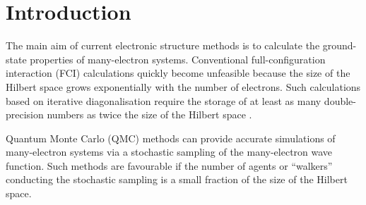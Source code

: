 \chapter{Introduction}
\ifpdf
    \graphicspath{{Introduction/IntroductionFigs/PNG/}{Introduction/IntroductionFigs/PDF/}{Introduction/IntroductionFigs/}}
\else
    \graphicspath{{Introduction/IntroductionFigs/EPS/}{Introduction/IntroductionFigs/}}
\fi



The main aim of current electronic structure methods is to calculate the ground-state properties of many-electron systems. Conventional full-configuration interaction (FCI) calculations quickly become unfeasible because the size of the Hilbert space grows exponentially with the number of electrons. Such calculations based on iterative diagonalisation require the storage of at least as many double-precision numbers as twice the size of the Hilbert space \cite{Szabados2011}. 

Quantum Monte Carlo (QMC) methods can provide accurate simulations of many-electron systems via a stochastic sampling of the many-electron wave function. Such methods are favourable if the number of agents or ``walkers'' conducting the stochastic sampling is a small fraction of the size of the Hilbert space. 

